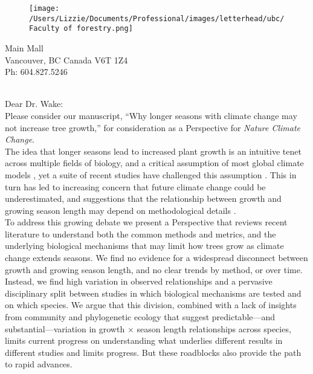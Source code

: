 \documentclass[11pt,a4paper]{article}
\begin{document}

\begin{figure}[htbp]
\hspace*{14cm}                                                           
\hspace{-35ex} \texttt{[image: /Users/Lizzie/Documents/Professional/images/letterhead/ubc/Faculty of forestry.png]}
\end{figure}
\vspace{-10ex}
\begin{small}
 Main Mall \\
\noindent Vancouver, BC Canada V6T 1Z4\\
\noindent Ph: 604.827.5246\\
\end{small}
\vspace{2ex}\\
\noindent Dear Dr. Wake: %
\vspace{1.5ex}\\
Please consider our manuscript, ``Why longer seasons with climate change may not increase tree growth,'' for consideration as a Perspective for \emph{Nature Climate Change}. 
\vspace{1.5ex}\\
The idea that longer seasons lead to increased plant growth is an intuitive tenet across multiple fields of biology, and a critical assumption of most global climate models \citep{friedlingstein2022global}, yet a suite of recent studies have challenged this assumption \citep[e.g.][]{dow2022warm,green2022limits}. This in turn has led to increasing concern that future climate change could be underestimated, and suggestions that the relationship between growth and growing season length may depend on methodological details \citep{green2022limits,korner2023four}.
\vspace{1.5ex}\\
To address this growing debate we present a Perspective that reviews recent literature to understand both the common methods and metrics, and the underlying biological mechanisms that may limit how trees grow as climate change extends seasons. We find no evidence for a widespread disconnect between growth and growing season length, and no clear trends by method, or over time. Instead, we find high variation in observed relationships and a pervasive disciplinary split between studies in which biological mechanisms are tested and on which species. We argue that this division, combined with a lack of insights from community and phylogenetic ecology that suggest predictable---and substantial---variation in growth $\times$ season length relationships across species, limits current progress on understanding what underlies different results in different studies and limits progress. But these roadblocks also provide the path to rapid advances. 
\end{document}
